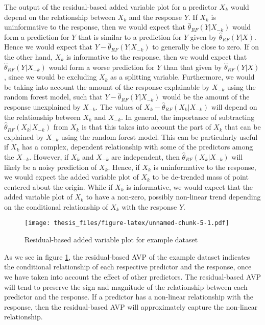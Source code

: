 \documentclass[12pt,twoside]{reedthesis}
\theoremstyle{definition}
\theoremstyle{definition}
\theoremstyle{definition}
\theoremstyle{remark}
\begin{document}
The output of the residual-based added variable plot for a predictor
\(X_k\) would depend on the relationship between \(X_k\) and the
response \(Y\). If \(X_k\) is uninformative to the response, then we
would expect that \(\hat{\theta}_{RF}(Y|X_{-k})\) would form a
prediction for \(Y\) that is similar to a prediction for \(Y\) given by
\(\hat{\theta}_{RF}(Y|X)\). Hence we would expect that
\(Y-\hat{\theta}_{RF}(Y|X_{-k})\) to generally be close to zero. If on
the other hand, \(X_k\) is informative to the response, then we would
expect that \(\hat{\theta}_{RF}(Y|X_{-k})\) would form a worse
prediction for \(Y\) than that given by \(\hat{\theta}_{RF}(Y|X)\),
since we would be excluding \(X_k\) as a splitting variable.
Furthermore, we would be taking into account the amount of the response
explainable by \(X_{-k}\) using the random forest model, such that
\(Y-\hat{\theta}_{RF}(Y|X_{-k})\) would be the amount of the response
unexplained by \(X_{-k}\). The values of
\(X_k-\hat{\theta}_{RF}(X_k|X_{-k})\) will depend on the relationship
between \(X_k\) and \(X_{-k}\). In general, the importance of
subtracting \(\hat{\theta}_{RF}(X_k|X_{-k})\) from \(X_k\) is that this
takes into account the part of \(X_k\) that can be explained by
\(X_{-k}\) using the random forest model. This can be particularly
useful if \(X_k\) has a complex, dependent relationship with some of the
predictors among the \(X_{-k}\). However, if \(X_k\) and \(X_{-k}\) are
independent, then \(\hat{\theta}_{RF}(X_k|X_{-k})\) will likely be a
noisy prediction of \(X_k\). Hence, if \(X_k\) is uninformative to the
response, we would expect the added variable plot of \(X_k\) to be
de-trended mass of point centered about the origin. While if \(X_k\) is
informative, we would expect that the added variable plot of \(X_k\) to
have a non-zero, possibly non-linear trend depending on the conditional
relationship of \(X_k\) with the response \(Y\). \par
\begin{figure}
\centering
\texttt{[image: thesis\_files/figure-latex/unnamed-chunk-5-1.pdf]}
\caption{\label{fig:unnamed-chunk-5}\label{AVPresex}Residual-based added
variable plot for example dataset}
\end{figure}
As we see in figure \ref{AVPresex}, the residual-based AVP of the
example dataset indicates the conditional relationship of each
respective predictor and the response, once we have taken into account
the effect of other predictors. The residual-based AVP will tend to
preserve the sign and magnitude of the relationship between each
predictor and the response. If a predictor has a non-linear relationship
with the response, then the residual-based AVP will approximately
capture the non-linear relationship.
\end{document}
